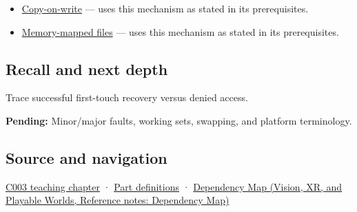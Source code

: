 \begin{itemize}
\tightlist
\item
  \hyperref[appendix-7a06e5baac04]{Copy-on-write} --- uses this mechanism as stated in its prerequisites.
\item
  \hyperref[appendix-313ee7a0ba7b]{Memory-mapped files} --- uses this mechanism as stated in its prerequisites.
\end{itemize}

\subsection{Recall and next depth}\label{appendix-cc0909a7ef14-recall-and-next-depth}

\hypertarget{appendix-cc0909a7ef14-recall-and-next-depth}{}

Trace successful first-touch recovery versus denied access.

\textbf{Pending:} Minor/major faults, working sets, swapping, and platform terminology.

\subsection{Source and navigation}\label{appendix-cc0909a7ef14-source-and-navigation}

\hypertarget{appendix-cc0909a7ef14-source-and-navigation}{}

\hyperref[01-foundations-i-ch002-where-the-bytes-live]{C003 teaching chapter} · \hyperref[appendix-fd090d982a15-m003---parts-41-60]{Part definitions} · \href{../07-Vision-XR-and-Playable-Worlds/main.pdf\#nameddest=appendix-4ad47bdd269a}{Dependency Map (Vision, XR, and Playable Worlds, Reference notes: Dependency Map)}
